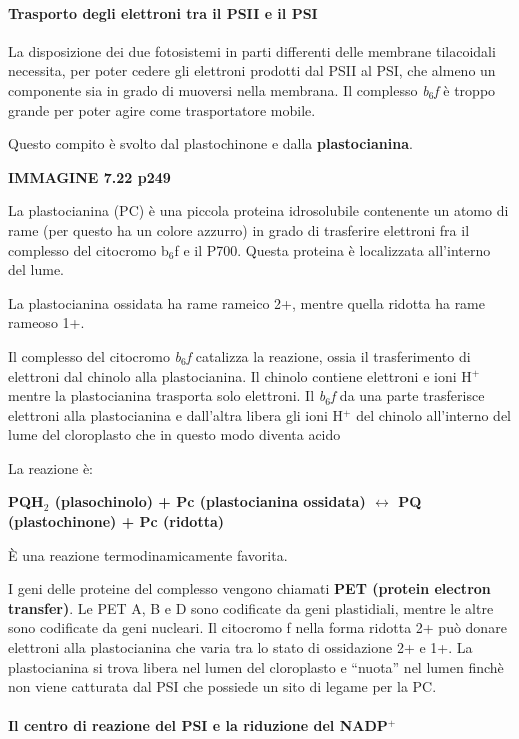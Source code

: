 \documentclass[]{article}
\begin{document}
\paragraph{Trasporto degli elettroni tra il PSII e il
PSI}\label{trasporto-degli-elettroni-tra-il-psii-e-il-psi}

La disposizione dei due fotosistemi in parti differenti delle membrane
tilacoidali necessita, per poter cedere gli elettroni prodotti dal PSII
al PSI, che almeno un componente sia in grado di muoversi nella
membrana. Il complesso \emph{b$_6$f} è troppo grande per poter agire
come trasportatore mobile.

Questo compito è svolto dal plastochinone e dalla
\textbf{plastocianina}.

\textbf{IMMAGINE 7.22 p249}

La plastocianina (PC) è una piccola proteina idrosolubile contenente un
atomo di rame (per questo ha un colore azzurro) in grado di trasferire
elettroni fra il complesso del citocromo b$_6$f e il P700. Questa
proteina è localizzata all'interno del lume.

La plastocianina ossidata ha rame rameico 2+, mentre quella ridotta ha
rame rameoso 1+.

Il complesso del citocromo \emph{b$_6$f} catalizza la reazione, ossia il
trasferimento di elettroni dal chinolo alla plastocianina. Il chinolo
contiene elettroni e ioni H$^+$ mentre la plastocianina trasporta solo
elettroni. Il \emph{b$_6$f} da una parte trasferisce elettroni alla
plastocianina e dall'altra libera gli ioni H$^+$ del chinolo all'interno
del lume del cloroplasto che in questo modo diventa acido

La reazione è:

\textbf{PQH$_2$ (plasochinolo) + Pc (plastocianina ossidata)
$\leftrightarrow$ PQ (plastochinone) + Pc (ridotta)}

È una reazione termodinamicamente favorita.

I geni delle proteine del complesso vengono chiamati \textbf{PET
(protein electron transfer)}. Le PET A, B e D sono codificate da geni
plastidiali, mentre le altre sono codificate da geni nucleari. Il
citocromo f nella forma ridotta 2+ può donare elettroni alla
plastocianina che varia tra lo stato di ossidazione 2+ e 1+. La
plastocianina si trova libera nel lumen del cloroplasto e ``nuota'' nel
lumen finchè non viene catturata dal PSI che possiede un sito di legame
per la PC.

\paragraph{Il centro di reazione del PSI e la riduzione del
NADP$^+$}\label{il-centro-di-reazione-del-psi-e-la-riduzione-del-nadp}
\end{document}
